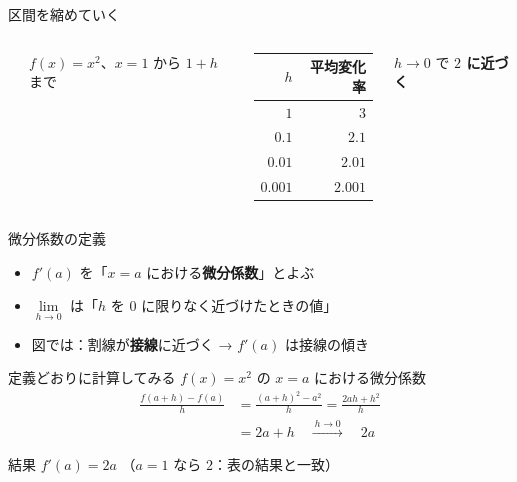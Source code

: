 \documentclass[aspectratio=169]{beamer}
\begin{document}
\begin{frame}{区間を縮めていく}
  \begin{columns}[c]
      \begin{center}
        
      \end{center}
      $f(x) = x^2$、$x = 1$ から $1 + h$ まで
      \medskip
      \begin{center}
        \begin{tabular}{rr}
          \toprule
          $h$ & 平均変化率 \\
          \midrule
          $1$ & $3$ \\
          $0.1$ & $2.1$ \\
          $0.01$ & $2.01$ \\
          $0.001$ & $2.001$ \\
          \bottomrule
        \end{tabular}
      \end{center}
      \medskip
      $h \to 0$ で \textbf{$2$ に近づく}
  \end{columns}
\end{frame}

\begin{frame}{微分係数の定義}
  \bigskip
  \begin{itemize}
    \item $f'(a)$ を「$x = a$ における\textbf{微分係数}」とよぶ
    \item $\lim\limits_{h \to 0}$ は「$h$ を $0$ に限りなく近づけたときの値」
    \item 図では：割線が\textbf{接線}に近づく → $f'(a)$ は接線の傾き
  \end{itemize}
\end{frame}

\begin{frame}{定義どおりに計算してみる}
  $f(x) = x^2$ の $x = a$ における微分係数
  \begin{align*}
    \frac{f(a+h) - f(a)}{h}
      &= \frac{(a+h)^2 - a^2}{h}
       = \frac{2ah + h^2}{h} \\
      &= 2a + h
      \quad \xrightarrow{\ h \to 0\ } \quad 2a
  \end{align*}
  \begin{block}{結果}
    $f'(a) = 2a$ \qquad （$a = 1$ なら $2$：表の結果と一致）
  \end{block}
\end{frame}
\end{document}
